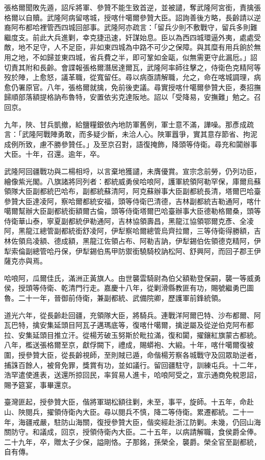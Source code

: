 \begin{pinyinscope}
張格爾聞敗先遁，詔斥將軍、參贊不能生致首逆，並被譴，奪武隆阿宮銜，責擒張格爾以自贖。武隆阿病留喀城，授喀什噶爾參贊大臣。詔詢善後方略，長齡請以逆裔阿布都哈裡管西四城回部事。武隆阿亦疏言：「留兵少則不敷戰守，留兵多則難繼度支。前此大兵進剿，幸克捷迅速，奸謀始息。臣以為西四城環逼外夷，處處受敵，地不足守，人不足臣，非如東四城為中路不可少之保障。與其糜有用兵餉於無用之地，不如歸並東四城，省兵費之半，即可鞏如金甌，似無需更守此漏卮。」詔切責其附和長齡。會諜報張格爾潛居達爾瓦，武隆阿率師往擊之，侍衛色克精阿等歿於陣，上愈怒，議革職，從寬留任。尋以病亟請解職，允之，命在喀城調理，病愈仍署原官。八年，張格爾就擒，免前後吏議。尋實授喀什噶爾參贊大臣，奏招撫歸順部落額提格訥布魯特，安置依劣克達阪地。詔以「受降易，安撫難」勉之。召回京。

九年，陜、甘兵凱撤，給鹽糧銀依內地防軍舊例，軍士意不滿，譁噪。那彥成疏言：「武隆阿戰陣勇敢，而多疑少斷，未洽人心。陜軍囂爭，實其意存節省、拘泥成例所致，慮不勝參贊任。」及至京召對，語復掩飾，降頭等侍衛。尋充和闐辦事大臣。十年，召還。逾年，卒。

武隆阿回疆戰功與二楊相埒，以言棄地獲譴，未膺優賞。宣宗念前勞，仍列功臣，繪像紫光閣。八旗諸將同列者：都統威勇侯哈哴阿，護軍統領阿勒罕保，庫爾烏蘇領隊大臣副都統巴哈布，副都統蘇清阿，阿克蘇辦事大臣副都統長清，塔爾巴哈臺參贊大臣達凌阿，察哈爾都統安福，頭等侍衛巴清德，吉林副都統吉勒通阿，喀什噶爾幫辦大臣副都統銜額爾古倫，頭等侍衛塔爾巴哈臺辦事大臣德勒格爾桑，頭等侍衛華山泰，寧夏副都統伊勒通阿，吉林協領壽昌，黑龍江協領鄂爾克彥、全凌阿，黑龍江總管副都統銜舒凌阿，伊犁察哈爾總管烏齊拉爾，三等侍衛得勝額，吉林佐領烏凌額、德成額，黑龍江佐領占布、阿勒吉訥，伊犁錫伯佐領德克精阿，伊犁索倫副總管哈丹保，伊犁錫伯馬甲防禦銜驍騎校訥松阿、舒興阿，而回子郡王伊薩克亦與焉。

哈哴阿，瓜爾佳氏，滿洲正黃旗人。由世襲雲騎尉為伯父額勒登保嗣，襲一等威勇侯，授頭等侍衛、乾清門行走。嘉慶十八年，從剿滑縣教匪有功，賜號繼勇巴圖魯。二十一年，晉御前侍衛，兼副都統、武備院卿，歷護軍前鋒統領。

道光六年，從長齡赴回疆，充領隊大臣，將騎兵。連戰洋阿爾巴特、沙布都爾、阿瓦巴特，擒安集延頭目阿瓦子邁瑪底等，復喀什噶爾，擒逆屬及從逆伯克阿布都拉、安集延頭目推立汗。從楊芳破玉努斯於毗拉滿，復和闐，擢鑲紅旗蒙古都統。八年，檻送張格爾至京，獻俘闕下，禮成，賜蟒袍、大緞。十年，喀什噶爾復被圍，授參贊大臣，從長齡視師，至則賊已遁，命偕楊芳察各城戰守及回眾助逆者，捕誅百餘人，被脅免罪，獎賞有功，並如議行。留回疆駐守，訓練屯兵。十二年，浩罕遣使進表，送還所掠回民，率貿易人進卡，哈哴阿受之，宣示通商免稅恩詔，賜予筵宴，事畢還京。

臺灣匪起，授參贊大臣，偕將軍瑚松額往剿，未至，事平，旋師。十五年，命赴山、陜閱兵，擢領侍衛內大臣。尋以閱兵不慎，降二等侍衛。累遷都統。二十一年，海疆戒嚴，駐防山海關，復授參贊大臣，偕奕經赴浙江防剿。未幾，仍回山海關防守。和議成，回京，授領侍衛內大臣。二十五年，以病請解職，食侯爵全俸。二十九年，卒，贈太子少保，謚剛恪。子那銘，孫榮全，襲爵。榮全官至副都統，自有傳。


\end{pinyinscope}
